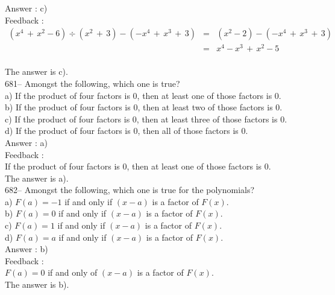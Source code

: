 \documentclass[letterpaper, 12pt]{article}
\begin{document}
Answer : c)\\

Feedback :\\
\begin{eqnarray*}
\left( x^{4}\,+\,x^{2}-6\right) \div\left( x^{2}\,+\,3\right) -\left(
-x^{4}\,+\,x^{3}\,+\,3\right)&=&\left( x^{2}-2\right)-\left(
-x^{4}\,+\,x^{3}\,+\,3\right)\\[1mm]
&=&x^{4}-x^{3}\,+\,x^{2}-5\\[1mm]
\end{eqnarray*}

The answer is c).\\

681-- Amongst the following, which one is true?\\
a) If the product of four factors is 0, then at least one of those factors is 0.  \\
b) If the product of four factors is 0, then at least two of those factors is 0. \\
c) If the product of four factors is 0, then at least three of those factors is 0. \\
d) If the product of four factors is 0, then all of those factors is 0.\\

Answer : a)\\

Feedback : \\
If the product of four factors is 0, then at least one of those factors is 0. \\
The answer is a).\\

682-- Amongst the following, which one is true for the polynomials?\\
a)  $F\left( a\right) = -1$ if and only if $\left( x-a\right) $
is a factor of $F\left( x\right) $.\\
b) $ F\left( a\right) = 0 $ if and only if $ \left( x-a\right) $
is a factor of $F\left( x\right) $.\\
c) $ F\left( a\right) = 1 $ if and only if $ \left( x-a\right) $
is a factor of $F\left( x\right) $.\\
d) $ F\left( a\right) = a $ if and only if $ \left( x-a\right) $
is a factor of $F\left( x\right) $.\\

Answer : b)\\

Feedback : \\
$ F\left( a\right) = 0 $ if and only of $ \left( x-a\right) $
is a factor of
$F\left( x\right) $.\\
The answer is b).\\
\end{document}
